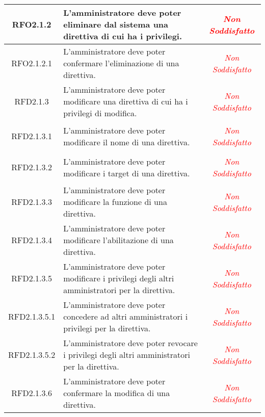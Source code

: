 \begin{longtable}{|c|>{\centering}m{7cm}|c|}
\hypertarget{RFO2.1.2}{RFO2.1.2} & L'amministratore deve poter eliminare dal sistema una direttiva di cui ha i privilegi. & \textcolor{Red}{\textit{Non Soddisfatto}}\\ \hline

\hypertarget{RFO2.1.2.1}{RFO2.1.2.1} & L'amministratore deve poter confermare l'eliminazione di una direttiva. & \textcolor{Red}{\textit{Non Soddisfatto}}\\ \hline

\hypertarget{RFD2.1.3}{RFD2.1.3} & L'amministratore deve poter modificare una direttiva di cui ha i privilegi di modifica. & \textcolor{Red}{\textit{Non Soddisfatto}}\\ \hline

\hypertarget{RFD2.1.3.1}{RFD2.1.3.1} & L'amministratore deve poter modificare il nome di una direttiva. & \textcolor{Red}{\textit{Non Soddisfatto}}\\ \hline

\hypertarget{RFD2.1.3.2}{RFD2.1.3.2} & L'amministratore deve poter modificare i target di una direttiva. & \textcolor{Red}{\textit{Non Soddisfatto}}\\ \hline

\hypertarget{RFD2.1.3.3}{RFD2.1.3.3} & L'amministratore deve poter modificare la funzione di una direttiva. & \textcolor{Red}{\textit{Non Soddisfatto}}\\ \hline

\hypertarget{RFD2.1.3.4}{RFD2.1.3.4} & L'amministratore deve poter modificare l'abilitazione di una direttiva. & \textcolor{Red}{\textit{Non Soddisfatto}}\\ \hline

\hypertarget{RFD2.1.3.5}{RFD2.1.3.5} & L'amministratore deve poter modificare i privilegi degli altri amministratori per la direttiva. & \textcolor{Red}{\textit{Non Soddisfatto}}\\ \hline

\hypertarget{RFD2.1.3.5.1}{RFD2.1.3.5.1} & L'amministratore deve poter concedere ad altri amministratori i privilegi per la direttiva. & \textcolor{Red}{\textit{Non Soddisfatto}}\\ \hline

\hypertarget{RFD2.1.3.5.2}{RFD2.1.3.5.2} & L'amministratore deve poter revocare i privilegi degli altri amministratori per la direttiva. & \textcolor{Red}{\textit{Non Soddisfatto}}\\ \hline

\hypertarget{RFD2.1.3.6}{RFD2.1.3.6} & L'amministratore deve poter confermare la modifica di una direttiva. & \textcolor{Red}{\textit{Non Soddisfatto}}\\ \hline


\end{longtable}
